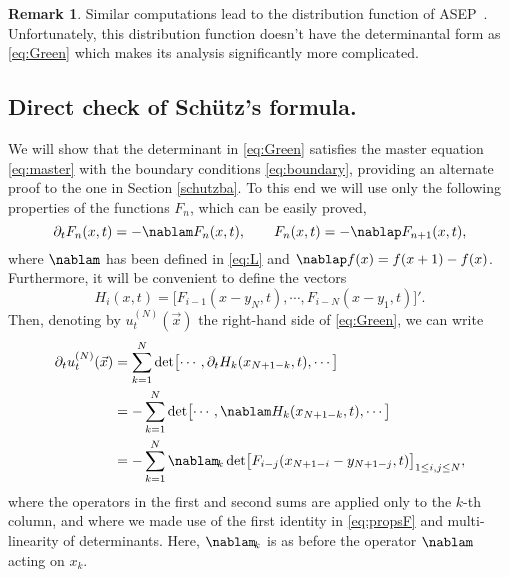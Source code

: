 \documentclass[]{pcmi}
\theoremstyle{plain}
\theoremstyle{definition}
\newtheorem{remark}[equation]{Remark}
\begin{document}
\begin{remark}
 	Similar computations lead to the distribution function of ASEP~\cite{MR2824604}. Unfortunately, this distribution function doesn't have the determinantal form as \eqref{eq:Green} which makes its analysis significantly more complicated.
\end{remark}

\subsection{Direct check of Sch\"{u}tz's formula.}
\label{ss:schutz_check}

We will show that the determinant in \eqref{eq:Green}  satisfies the master equation \eqref{eq:master} with the boundary conditions \eqref{eq:boundary}, providing an alternate proof to the one in Section \ref{schutzba}. To this end we will use only the following properties of the functions $F_{n}$, which can be easily proved,
\begin{equation}\label{eq:F_props}
\partial_t F_{n}(x,t) = -\nablam F_{n}(x,t), \qquad F_{n}(x,t) = -\nablap F_{n+1}(x,t),
\end{equation}
where $\nablam$ has been defined in \eqref{eq:L} and $\nablap f(x) = f(x+1) - f(x)$. Furthermore, it will be convenient to define the vectors
\begin{equation}\label{eq:propsF}
H_i(x, t) = \bigl[F_{i - 1}(x-y_{N},t), \cdots, F_{i - N}(x-y_{1},t) \bigr]'.
\end{equation}
Then, denoting by $u_t^{(N)}(\vec x)$ the right-hand side of \eqref{eq:Green}, we can write
\begin{align*}
\partial_t u_t^{(N)}(\vec x) &= \sum_{k = 1}^N \det \bigl[\cdots, \partial_t H_k(x_{N+1 - k}, t), \cdots\bigr]\\
&= -\sum_{k = 1}^N \det \bigl[\cdots, \nablam H_k(x_{N+1 - k}, t), \cdots\bigr]\\
&= -\sum_{k=1}^N \nablam_{\!k} \det \bigl[F_{i - j}(x_{N+1 - i}-y_{N+1 - j},t)\bigr]_{1\leq i,j\leq N},
\end{align*}
where the operators in the first and second sums are applied only to the $k$-th column, and where we made use of the first identity in \eqref{eq:propsF} and multi-linearity of determinants. Here, $\nablam_{\!k}$ is as before the operator $\nablam$ acting on $x_k$. 
\end{document}

